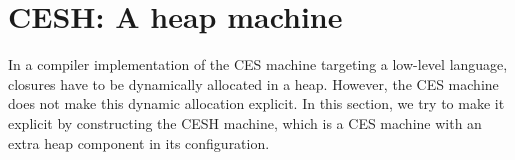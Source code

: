 \documentclass{article}
\theoremstyle{definition}
\newcommand{\Varid}[1]{\mathit{#1}}
\def\resethooks{\global\let\SaveRestoreHook\empty
  \global\let\ColumnHook\empty}
\newlength{\blanklineskip}
\newcommand{\hsindent}[1]{\quad}\let\hspre\empty
\let\hspost\empty
\renewcommand\Varid[1]{\mathord{\textsf{#1}}}
\newcommand\Keyword[1]{\textsf{\textbf{#1}}}
\newcommand\MyConid[1]{\mathord{\textsf{\textbf{#1}}}}
\renewcommand\Keyword[1]{\textsf{\underline{#1}}}
\renewcommand\Varid[1]{\textsf{#1}}
\begin{document}
\begin{comment}
\begin{hscode}\SaveRestoreHook
\column{B}{@{}>{\hspre}l<{\hspost}@{}}\column{3}{@{}>{\hspre}l<{\hspost}@{}}\column{5}{@{}>{\hspre}l<{\hspost}@{}}\column{E}{@{}>{\hspre}l<{\hspost}@{}}\>[B]{}\Varid{convergent-cfg-doesn't-diverge}\;\mathbin{:}\;\Varid{∀}\;\Varid{cfg}\;\Varid{→}\;\Varid{cfg}\;\downarrow_{\Varid{CES}}\;\Varid{→}\;\Varid{¬}\;(\Varid{cfg}\;\uparrow_{\Varid{CES}}){}\<[E]\\
\>[B]{}\Varid{convergent-cfg-doesn't-diverge}\;\Varid{cfg}\;(\Varid{v},\Varid{cfg⟶*v})\;\Varid{cfg↑}\;\mathrel{=}\;\Varid{lemma}\;(\Varid{cfg↑}\;(\MyConid{END},[\mskip1.5mu \mskip1.5mu],\MyConid{val}\;\Varid{v}\;\Varid{∷}\;[\mskip1.5mu \mskip1.5mu])\;\Varid{cfg⟶*v}){}\<[E]\\
\>[B]{}\hsindent{3}{}\<[3]\>[3]{}\Keyword{where}{}\<[E]\\
\>[3]{}\hsindent{2}{}\<[5]\>[5]{}\Varid{lemma}\;\mathbin{:}\;\Varid{∀}\;\{\mskip1.5mu \Varid{v}\mskip1.5mu\}\;\Varid{→}\;\Varid{¬}\;(\Varid{∃}\;\Varid{λ}\;\Varid{cfg}\;\Varid{→}\;(\MyConid{END},[\mskip1.5mu \mskip1.5mu],\MyConid{val}\;\Varid{v}\;\Varid{∷}\;[\mskip1.5mu \mskip1.5mu])\;\xrightarrow[\Varid{CES}]{}\;\Varid{cfg}){}\<[E]\\
\>[3]{}\hsindent{2}{}\<[5]\>[5]{}\Varid{lemma}\;(\Varid{cfg},()){}\<[E]\\[\blanklineskip]\>[B]{}\Varid{divergent-cfg-doesn't-converge}\;\mathbin{:}\;\Varid{∀}\;\Varid{cfg}\;\Varid{→}\;\Varid{cfg}\;\uparrow_{\Varid{CES}}\;\Varid{→}\;\Varid{¬}\;(\Varid{cfg}\;\downarrow_{\Varid{CES}}){}\<[E]\\
\>[B]{}\Varid{divergent-cfg-doesn't-converge}\;\Varid{cfg}\;\Varid{cfg↑}\;\Varid{cfg↓}\;\mathrel{=}\;\Varid{convergent-cfg-doesn't-diverge}\;\Varid{cfg}\;\Varid{cfg↓}\;\Varid{cfg↑}{}\<[E]\ColumnHook
\end{hscode}\resethooks
\end{comment}
\section{CESH: A heap machine} \label{section:CESH}
In a compiler implementation of the CES machine targeting a low-level
language, closures have to be dynamically allocated in a
heap. However, the CES machine does not make this dynamic allocation
explicit. In this section, we try to make it explicit by
constructing the CESH machine, which is a CES machine with an extra heap
component in its configuration.
\end{document}
